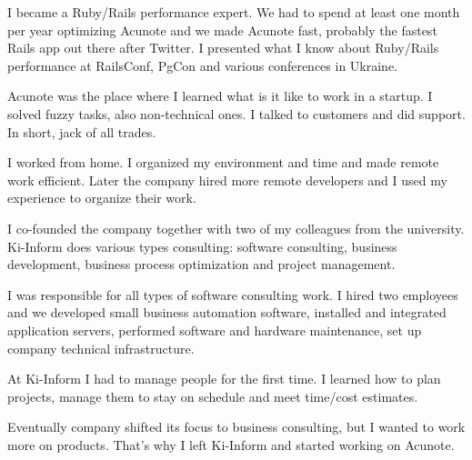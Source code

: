 \documentclass[12pt]{letter}
\begin{document}
\begin{llist}
           \item I became a Ruby/Rails performance expert. We had to spend at least one month per year optimizing Acunote and we made Acunote fast, probably the fastest Rails app out there after Twitter. I presented what I know about Ruby/Rails performance at RailsConf, PgCon and various conferences in Ukraine.

           \item Acunote was the place where I learned what is it like to work in a startup. I solved fuzzy tasks, also non-technical ones. I talked to customers and did support. In short, jack of all trades.

           \item I worked from home. I organized my environment and time and made remote work efficient. Later the company hired more remote developers and I used my experience to organize their work.

  \endexperience


  \startexperience

           \item I co-founded the company together with two of my colleagues from the university. Ki-Inform does various types consulting: software consulting, business development, business process optimization and project management.

           \item  I was responsible for all types of software consulting work. I hired two employees and we developed small business automation software, installed and integrated application servers, performed software and hardware maintenance, set up company technical infrastructure.

           \item  At Ki-Inform I had to manage people for the first time. I learned how to plan projects, manage them to stay on schedule and meet time/cost estimates.

           \item  Eventually company shifted its focus to business consulting, but I wanted to work more on products. That's why I left Ki-Inform and started working on Acunote.

  \endexperience





\end{llist}
\end{document}
